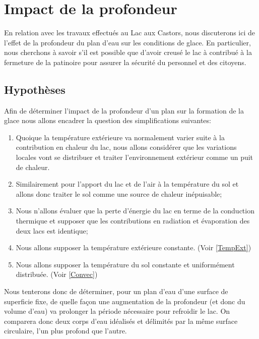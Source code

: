 \documentclass[12pt]{article}
\begin{document}
\section{Impact de la profondeur}

En relation avec les travaux effectu\'es au Lac aux Castors, nous discuterons ici de l'effet de la
profondeur du plan d'eau sur les conditions de glace. En particulier, nous cherchons \`a savoir s'il est
possible que d'avoir creus\'e\cite{Lac} le lac \`a contribu\'e \`a la fermeture de la patinoire pour
assurer la s\'ecurit\'e du personnel et des citoyens.

\subsection{Hypoth\`eses}

Afin de d\'eterminer l'impact de la profondeur d'un plan sur la formation de la glace nous allons
encadrer la question des simplifications suivantes:

\begin{enumerate}
    \item Quoique la temp\'erature ext\'erieure va normalement varier suite \`a la contribution
        en chaleur du lac, nous allons consid\'erer que les variations locales vont se distribuer
        et traiter l'environnement ext\'erieur comme un puit de chaleur.
    \item Similairement pour l'apport du lac et de l'air \`a la temp\'erature du sol et allons
        donc traiter le sol comme une source de chaleur in\'epuisable;
    \item Nous n'allons \'evaluer que la perte d'\'energie du lac en terme de la conduction thermique
        et supposer que les contributions en radiation et \'evaporation\cite{Evap} des deux lacs est
        identique;
    \item Nous allons supposer la temp\'erature ext\'erieure constante. (Voir \ref{TempExt})
    \item Nous allons supposer la temp\'erature du sol constante et uniform\'ement distribu\'ee.
        (Voir \ref{Convec})
\end{enumerate}

Nous tenterons donc de d\'eterminer, pour un plan d'eau d'une surface de superficie fixe, de quelle fa\c
con une augmentation de la profondeur (et donc du volume d'eau) va prolonger la p\'eriode n\'ecessaire
pour refroidir le lac. On comparera donc deux corps d'eau id\'ealis\'es et d\'elimit\'es par la m\^eme
surface circulaire, l'un plus profond que l'autre.
\end{document}
